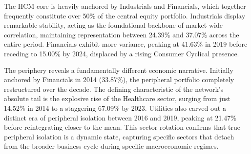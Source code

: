 \documentclass[fleqn]{rbfin}
\begin{document}
The HCM core is heavily anchored by Industrials and Financials, which together frequently constitute over 50\% of the central equity portfolio. Industrials display remarkable stability, acting as the foundational backbone of market-wide correlation, maintaining representation between 24.39\% and 37.07\% across the entire period. Financials exhibit more variance, peaking at 41.63\% in 2019 before receding to 15.00\% by 2024, displaced by a rising Consumer Cyclical presence.

The periphery reveals a fundamentally different economic narrative. Initially anchored by Financials in 2014 (33.87\%), the peripheral portfolio completely restructured over the decade. The defining characteristic of the network's absolute tail is the explosive rise of the Healthcare sector, surging from just 14.52\% in 2014 to a staggering 67.09\% by 2023. Utilities also carved out a distinct era of peripheral isolation between 2016 and 2019, peaking at 21.47\% before reintegrating closer to the mean. This sector rotation confirms that true peripheral isolation is a dynamic state, capturing specific sectors that detach from the broader business cycle during specific macroeconomic regimes.
\end{document}
